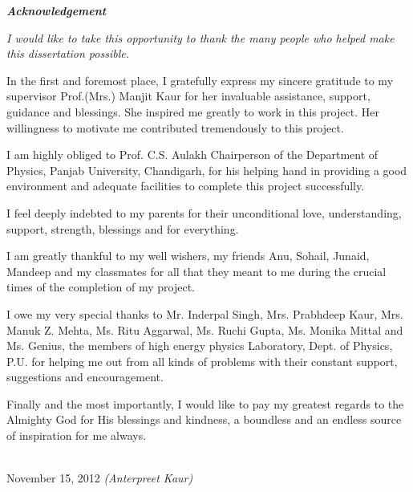 \begin{center}
{\large \bf{\em Acknowledgement}}
\end{center}
\vspace*{0.5cm}
{ \em
I would like to take this opportunity to thank the many people who helped make this dissertation possible.

In the first and foremost place, I gratefully express my sincere gratitude to my supervisor Prof.(Mrs.) Manjit Kaur for her invaluable assistance, support, guidance and blessings. She inspired me greatly to work in this project. Her willingness to motivate me contributed tremendously to this project. 

I am highly obliged to Prof. C.S. Aulakh Chairperson of the Department of Physics, Panjab University, Chandigarh, for his helping hand in providing a good environment and adequate facilities to complete this project successfully.

I feel deeply indebted to my parents for their unconditional love, understanding, support, strength, blessings and for everything.

I am greatly thankful to my well wishers, my friends Anu, Sohail, Junaid, Mandeep and my classmates for all that they meant to me during the crucial times of the completion of my project.

I owe my very special thanks to Mr. Inderpal Singh, Mrs. Prabhdeep Kaur, Mrs. Manuk Z. Mehta, Ms. Ritu Aggarwal, Ms. Ruchi Gupta, Ms. Monika Mittal and Ms. Genius, the members of high energy physics Laboratory, Dept. of Physics, P.U. for helping me out from all kinds of problems with their constant support, suggestions and encouragement. 

Finally and the most importantly, I would like to pay my greatest regards to the Almighty God for His blessings and kindness, a boundless and an endless source of inspiration for me always.} \\[2cm]
{November 15, 2012} \hspace*{8.cm}
{\em (Anterpreet Kaur)}

